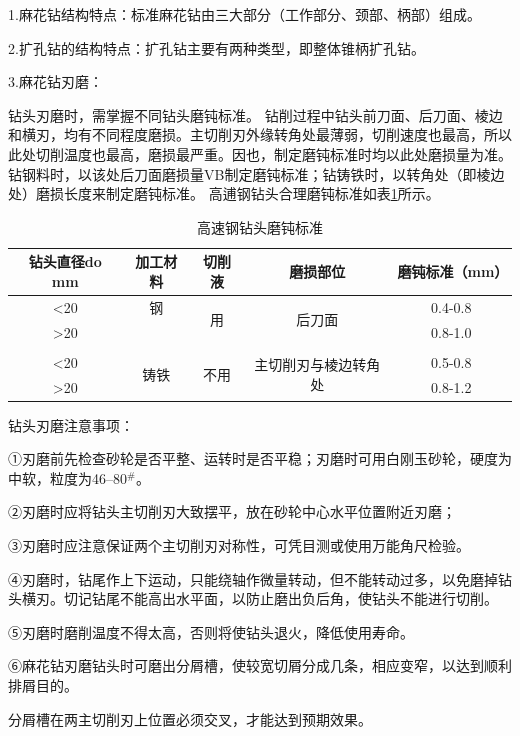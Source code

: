 \documentclass{ctexbook}
\begin{document}
1.麻花钻结构特点：标准麻花钻由三大部分（工作部分、颈部、柄部）组成。

2.扩孔钻的结构特点：扩孔钻主要有两种类型，即整体锥柄扩孔钻。

3.麻花钻刃磨：

钻头刃磨时，需掌握不同钻头磨钝标准。
钻削过程中钻头前刀面、后刀面、棱边和横刃，均有不同程度磨损。主切削刃外缘转角处最薄弱，切削速度也最高，所以此处切削温度也最高，磨损最严重。因也，制定磨钝标准时均以此处磨损量为准。钻钢料时，以该处后刀面磨损量VB制定磨钝标准；钻铸铁时，以转角处（即棱边处）磨损长度来制定磨钝标准。
高逋钢钻头合理磨钝标准如表\ref{tab:gaosugangzuantou}所示。
\begin{table}[htbp]
	\centering
	\caption{高速钢钻头磨钝标准}
	\begin{tabular}{c|c|c|c|c}
		\toprule
		钻头直径do mm & 加工材料  & 切削液   & 磨损部位  & 磨钝标准（mm） \\
		\midrule
		<20   & 钢     & \multirow{2}[4]{*}{用} & \multirow{2}[4]{*}{后刀面} & 0.4-0.8 \\
		\cmidrule{1-2}\cmidrule{5-5}    >20   &       &       &       & 0.8-1.0 \\
		\midrule
		&       &       &       &  \\
		\midrule
		<20   & \multirow{2}[4]{*}{铸铁} & \multirow{2}[4]{*}{不用} & \multirow{2}[4]{*}{主切削刃与棱边转角处} & 0.5-0.8 \\
		\cmidrule{1-1}\cmidrule{5-5}    >20   &       &       &       & 0.8-1.2 \\
		\bottomrule
	\end{tabular}%
	\label{tab:gaosugangzuantou}%
\end{table}%
钻头刃磨注意事项：

①刃磨前先检查砂轮是否平整、运转时是否平稳；刃磨时可用白刚玉砂轮，硬度为中软，粒度为46--80$^{\#}$。

②刃磨时应将钻头主切削刃大致摆平，放在砂轮中心水平位置附近刃磨；

③刃磨时应注意保证两个主切削刃对称性，可凭目测或使用万能角尺检验。

④刃磨时，钻尾作上下运动，只能绕轴作微量转动，但不能转动过多，以免磨掉钻头横刃。切记钻尾不能高出水平面，以防止磨出负后角，使钻头不能进行切削。

⑤刃磨时磨削温度不得太高，否则将使钻头退火，降低使用寿命。

⑥麻花钻刃磨钻头时可磨出分屑槽，使较宽切屑分成几条，相应变窄，以达到顺利排屑目的。

分屑槽在两主切削刃上位置必须交叉，才能达到预期效果。
\end{document}
